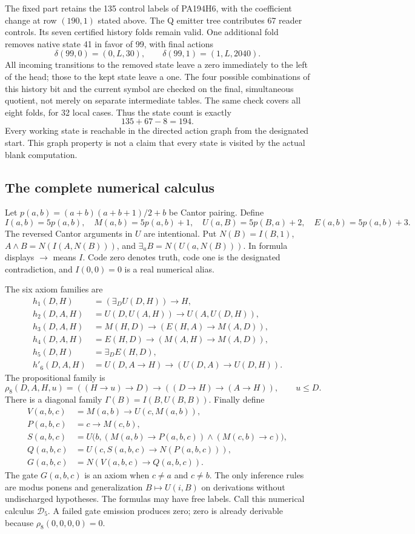 The fixed part retains the 135 control labels of PA194H6, with the
coefficient change at row $(190,1)$ stated above. The Q emitter
tree contributes 67 reader controls. Its seven certified history folds
remain valid. One additional fold removes native state 41 in favor of 99,
with final actions
\[
 \delta(99,0)=(0,L,30),\qquad
 \delta(99,1)=(1,L,2040).
\]
All incoming transitions to the removed state leave a zero immediately
to the left of the head; those to the kept state leave a one. The four
possible combinations of this history bit and the current symbol are
checked on the final, simultaneous quotient, not merely on separate
intermediate tables. The same check covers all eight folds, for 32 local
cases. Thus the state count is exactly
\[
                         135+67-8=194.
\]
Every working state is reachable in the directed action graph from the
designated start. This graph property is not a claim that every state is
visited by the actual blank computation.

\subsection{The complete numerical calculus}

Let $p(a,b)=(a+b)(a+b+1)/2+b$ be Cantor pairing. Define
\[
 I(a,b)=5p(a,b),\quad M(a,b)=5p(a,b)+1,\quad
 U(a,B)=5p(B,a)+2,\quad E(a,b)=5p(a,b)+3.
\]
The reversed Cantor arguments in $U$ are intentional. Put
$N(B)=I(B,1)$, $A\wedge B=N(I(A,N(B)))$, and
$\exists_a B=N(U(a,N(B)))$. In formula displays $\to$ means $I$.
Code zero denotes truth, code one is the designated contradiction, and
$I(0,0)=0$ is a real numerical alias.

The six axiom families are
\begin{align*}
 h_1(D,H)&=(\exists_D U(D,H))\to H,\\
 h_2(D,A,H)&=U(D,U(A,H))\to U(A,U(D,H)),\\
 h_3(D,A,H)&=M(H,D)\to(E(H,A)\to M(A,D)),\\
 h_4(D,A,H)&=E(H,D)\to(M(A,H)\to M(A,D)),\\
 h_5(D,H)&=\exists_D E(H,D),\\
 h'_6(D,A,H)&=U(D,A\to H)\to(U(D,A)\to U(D,H)).
\end{align*}
The propositional family is
\[
 \rho_8(D,A,H,u)=((H\to u)\to D)\to((D\to H)\to(A\to H)),
 \qquad u\leq D.
\]
There is a diagonal family $\Gamma(B)=I(B,U(B,B))$. Finally define
\begin{align*}
 V(a,b,c)&=M(a,b)\to U(c,M(a,b)),\\
 P(a,b,c)&=c\to M(c,b),\\
 S(a,b,c)&=U\bigl(b,(M(a,b)\to P(a,b,c))
                         \wedge(M(c,b)\to c)\bigr),\\
 Q(a,b,c)&=U(c,S(a,b,c)\to N(P(a,b,c))),\\
 G(a,b,c)&=N(V(a,b,c)\to Q(a,b,c)).
\end{align*}
The gate $G(a,b,c)$ is an axiom when $c\ne a$ and $c\ne b$.
The only inference rules are modus ponens and generalization
$B\mapsto U(i,B)$ on derivations without undischarged hypotheses. The
formulas may have free labels. Call this numerical calculus
$\mathcal D_5$. A failed gate emission produces zero; zero is already
derivable because $\rho_8(0,0,0,0)=0$.

